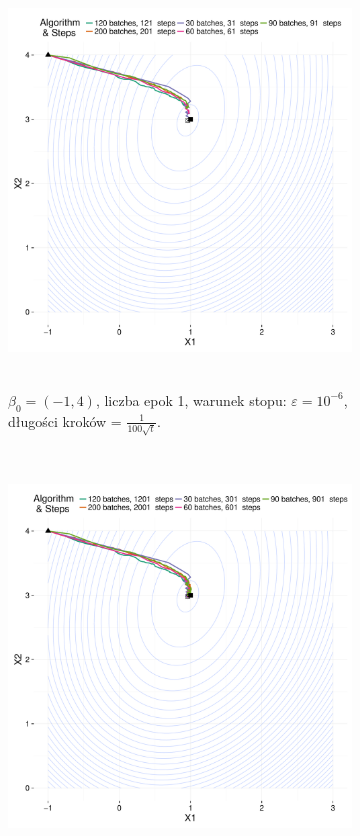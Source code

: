 	
\begin{figure}[hbt!]
  \begin{center}
   \begin{subfigure}[h!]{0.9\textwidth}
      \includegraphics[width=\textwidth, height=310pt]{Obrazki/b_m1_4_iter_1_e-6_100sqrt.pdf}
      \caption{$\beta_0=(-1,4)$, liczba epok 1, warunek stopu: $\varepsilon=10^{-6}$, długości kroków = $\frac{1}{100\sqrt{t}}$.}
   \end{subfigure}     
   \begin{subfigure}[h!]{0.9\textwidth}
      \includegraphics[width=\textwidth, height=310pt]{Obrazki/b_m1_4_iter_10_e-5_100sqrt.pdf}

\end{subfigure}
\end{center}
\end{figure}
